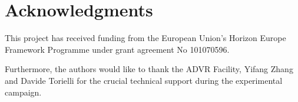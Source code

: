 \section*{Acknowledgments}
This project has received funding from the European Union's Horizon Europe Framework Programme under grant agreement No 101070596. 

Furthermore, the authors would like to thank the ADVR Facility, Yifang Zhang and Davide Torielli for the crucial technical support during the experimental campaign.

